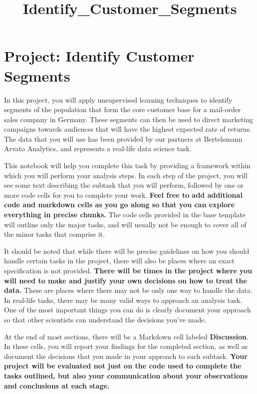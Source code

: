 \documentclass[11pt]{article}
\title{Identify\_Customer\_Segments}
\begin{document}
    
    
    \maketitle
    
    

    
    \hypertarget{project-identify-customer-segments}{%
\section{Project: Identify Customer
Segments}\label{project-identify-customer-segments}}

In this project, you will apply unsupervised learning techniques to
identify segments of the population that form the core customer base for
a mail-order sales company in Germany. These segments can then be used
to direct marketing campaigns towards audiences that will have the
highest expected rate of returns. The data that you will use has been
provided by our partners at Bertelsmann Arvato Analytics, and represents
a real-life data science task.

This notebook will help you complete this task by providing a framework
within which you will perform your analysis steps. In each step of the
project, you will see some text describing the subtask that you will
perform, followed by one or more code cells for you to complete your
work. \textbf{Feel free to add additional code and markdown cells as you
go along so that you can explore everything in precise chunks.} The code
cells provided in the base template will outline only the major tasks,
and will usually not be enough to cover all of the minor tasks that
comprise it.

It should be noted that while there will be precise guidelines on how
you should handle certain tasks in the project, there will also be
places where an exact specification is not provided. \textbf{There will
be times in the project where you will need to make and justify your own
decisions on how to treat the data.} These are places where there may
not be only one way to handle the data. In real-life tasks, there may be
many valid ways to approach an analysis task. One of the most important
things you can do is clearly document your approach so that other
scientists can understand the decisions you've made.

At the end of most sections, there will be a Markdown cell labeled
\textbf{Discussion}. In these cells, you will report your findings for
the completed section, as well as document the decisions that you made
in your approach to each subtask. \textbf{Your project will be evaluated
not just on the code used to complete the tasks outlined, but also your
communication about your observations and conclusions at each stage.}
\end{document}
